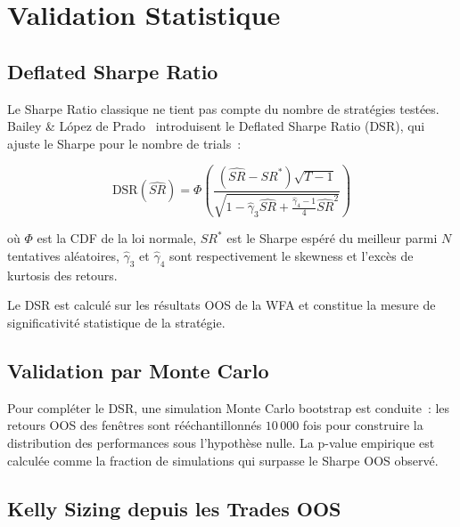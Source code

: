 \section{Validation Statistique}
\label{sec:validation_stat}

\subsection{Deflated Sharpe Ratio}

Le Sharpe Ratio classique ne tient pas compte du nombre de stratégies testées.
Bailey \& López de Prado~\cite{bailey2012} introduisent le Deflated Sharpe Ratio
(DSR), qui ajuste le Sharpe pour le nombre de trials~:

\begin{equation}
\text{DSR}(\hat{SR}) = \Phi\!\left(
\frac{(\hat{SR} - SR^*) \sqrt{T-1}}{\sqrt{1 - \hat{\gamma}_3 \hat{SR}
+ \frac{\hat{\gamma}_4 - 1}{4}\hat{SR}^2}}
\right)
\label{eq:dsr}
\end{equation}

où $\Phi$ est la CDF de la loi normale, $SR^*$ est le Sharpe espéré du meilleur
parmi $N$ tentatives aléatoires, $\hat{\gamma}_3$ et $\hat{\gamma}_4$ sont
respectivement le skewness et l'excès de kurtosis des retours.

Le DSR est calculé sur les résultats OOS de la WFA et constitue la mesure de
significativité statistique de la stratégie.

\subsection{Validation par Monte Carlo}

Pour compléter le DSR, une simulation Monte Carlo bootstrap est conduite~: les
retours OOS des fenêtres sont rééchantillonnés $10\,000$ fois pour construire
la distribution des performances sous l'hypothèse nulle. La p-value empirique
est calculée comme la fraction de simulations qui surpasse le Sharpe OOS observé.


\subsection{Kelly Sizing depuis les Trades OOS}

